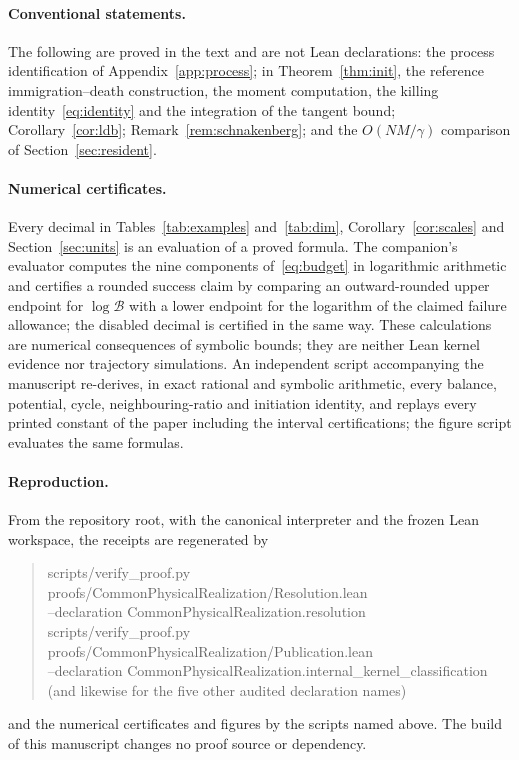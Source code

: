 \documentclass[11pt,a4paper]{article}
\theoremstyle{plain}
\theoremstyle{definition}
\theoremstyle{remark}
\newcommand{\Bud}{\mathcal B}
\begin{document}
\paragraph{Conventional statements.}
The following are proved in the text and are not Lean declarations: the process identification of Appendix~\ref{app:process}; in Theorem~\ref{thm:init}, the reference immigration--death construction, the moment computation, the killing identity~\eqref{eq:identity} and the integration of the tangent bound; Corollary~\ref{cor:ldb}; Remark~\ref{rem:schnakenberg}; and the $O(NM/\gamma)$ comparison of Section~\ref{sec:resident}.

\paragraph{Numerical certificates.}
Every decimal in Tables~\ref{tab:examples} and~\ref{tab:dim}, Corollary~\ref{cor:scales} and Section~\ref{sec:units} is an evaluation of a proved formula. The companion's evaluator computes the nine components of~\eqref{eq:budget} in logarithmic arithmetic and certifies a rounded success claim by comparing an outward-rounded upper endpoint for $\log\Bud$ with a lower endpoint for the logarithm of the claimed failure allowance; the disabled decimal is certified in the same way. These calculations are numerical consequences of symbolic bounds; they are neither Lean kernel evidence nor trajectory simulations. An independent script accompanying the manuscript re-derives, in exact rational and symbolic arithmetic, every balance, potential, cycle, neighbouring-ratio and initiation identity, and replays every printed constant of the paper including the interval certifications; the figure script evaluates the same formulas.

\paragraph{Reproduction.}
From the repository root, with the canonical interpreter and the frozen Lean workspace, the receipts are regenerated by
\begin{quote}\footnotesize\ttfamily\raggedright
scripts/verify\_proof.py proofs/CommonPhysicalRealization/Resolution.lean\\
\quad --declaration CommonPhysicalRealization.resolution\\[3pt]
scripts/verify\_proof.py proofs/CommonPhysicalRealization/Publication.lean\\
\quad --declaration CommonPhysicalRealization.internal\_kernel\_classification\\
\quad (and likewise for the five other audited declaration names)
\end{quote}
and the numerical certificates and figures by the scripts named above. The build of this manuscript changes no proof source or dependency.



\end{document}

